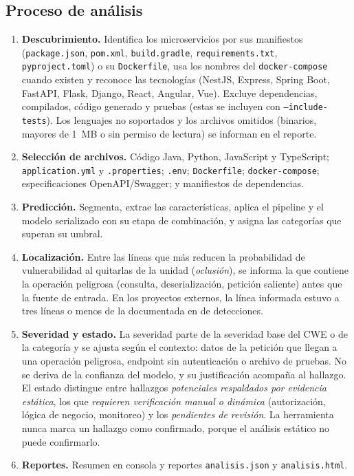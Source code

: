 \documentclass[12pt,a4paper]{article}
\newcommand{\cod}[1]{\texttt{#1}}
\begin{document}
\subsection{Proceso de análisis}
\begin{enumerate}
  \item \textbf{Descubrimiento.} Identifica los microservicios por sus manifiestos (\cod{package.json}, \cod{pom.xml}, \cod{build.gradle}, \cod{requirements.txt}, \cod{pyproject.toml}) o su \cod{Dockerfile}, usa los nombres del \cod{docker-compose} cuando existen y reconoce las tecnologías (NestJS, Express, Spring Boot, FastAPI, Flask, Django, React, Angular, Vue). Excluye dependencias, compilados, código generado y pruebas (estas se incluyen con \cod{--include-tests}). Los lenguajes no soportados y los archivos omitidos (binarios, mayores de 1~MB o sin permiso de lectura) se informan en el reporte.
  \item \textbf{Selección de archivos.} Código Java, Python, JavaScript y TypeScript; \cod{application.yml} y \cod{.properties}; \cod{.env}; \cod{Dockerfile}; \cod{docker-compose}; especificaciones OpenAPI/Swagger; y manifiestos de dependencias.
  \item \textbf{Predicción.} Segmenta, extrae las características, aplica el pipeline y el modelo serializado con su etapa de combinación, y asigna las categorías que superan su umbral.
  \item \textbf{Localización.} Entre las líneas que más reducen la probabilidad de vulnerabilidad al quitarlas de la unidad (\emph{oclusión}), se informa la que contiene la operación peligrosa (consulta, deserialización, petición saliente) antes que la fuente de entrada. En los proyectos externos, la línea informada estuvo a tres líneas o menos de la documentada en \locTres{} de \locN{} detecciones.
  \item \textbf{Severidad y estado.} La severidad parte de la severidad base del CWE o de la categoría y se ajusta según el contexto: datos de la petición que llegan a una operación peligrosa, endpoint sin autenticación o archivo de pruebas. No se deriva de la confianza del modelo, y su justificación acompaña al hallazgo. El estado distingue entre hallazgos \emph{potenciales respaldados por evidencia estática}, los que \emph{requieren verificación manual o dinámica} (autorización, lógica de negocio, monitoreo) y los \emph{pendientes de revisión}. La herramienta nunca marca un hallazgo como confirmado, porque el análisis estático no puede confirmarlo.
  \item \textbf{Reportes.} Resumen en consola y reportes \cod{analisis.json} y \cod{analisis.html}.
\end{enumerate}
\end{document}
